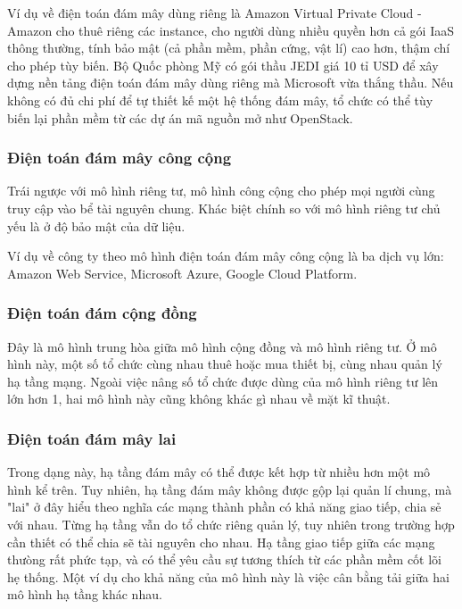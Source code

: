 \documentclass{article}
\begin{document}
Ví dụ về điện toán đám mây dùng riêng là Amazon Virtual Private Cloud - Amazon
cho thuê riêng các instance, cho người dùng nhiều quyền hơn cả gói IaaS thông
thường, tính bảo mật (cả phần mềm, phần cứng, vật lí) cao hơn, thậm chí cho phép
tùy biến. Bộ Quốc phòng Mỹ có gói thầu JEDI giá 10 tỉ USD để xây dựng nền tảng
điện toán đám mây dùng riêng mà Microsoft vừa thắng thầu. Nếu không có đủ chi
phí để tự thiết kế một hệ thống đám mây, tổ chức có thể tùy biến lại phần mềm từ
các dự án mã nguồn mở như OpenStack.

\subsubsection{Điện toán đám mây công cộng}

Trái ngược với mô hình riêng tư, mô hình công cộng cho phép mọi người cùng truy
cập vào bể tài nguyên chung. Khác biệt chính so với mô hình riêng tư chủ yếu là
ở độ bảo mật của dữ liệu.

Ví dụ về công ty theo mô hình điện toán đám mây công cộng là ba dịch vụ lớn:
Amazon Web Service, Microsoft Azure, Google Cloud Platform.

\subsubsection{Điện toán đám cộng đồng}

Đây là mô hình trung hòa giữa mô hình cộng đồng và mô hình riêng tư. Ở mô hình
này, một số tổ chức cùng nhau thuê hoặc mua thiết bị, cùng nhau quản lý hạ tầng
mạng. Ngoài việc nâng số tổ chức được dùng của mô hình riêng tư lên lớn hơn 1,
hai mô hình này cũng không khác gì nhau về mặt kĩ thuật.

\subsubsection{Điện toán đám mây lai}

Trong dạng này, hạ tầng đám mây có thể được kết hợp từ nhiều hơn một mô hình kể
trên. Tuy nhiên, hạ tầng đám mây không được gộp lại quản lí chung, mà "lai" ở
đây hiểu theo nghĩa các mạng thành phần có khả năng giao tiếp, chia sẻ với nhau.
Từng hạ tầng vẫn do tổ chức riêng quản lý, tuy nhiên trong trường hợp cần thiết
có thể chia sẽ tài nguyên cho nhau. Hạ tầng giao tiếp giữa các mạng thưòng rất
phức tạp, và có thể yêu cầu sự tương thích từ các phần mềm cốt lõi hẹ thống. Một
ví dụ cho khả năng của mô hình này là việc cân bằng tải giữa hai mô hình hạ tầng
khác nhau.
\end{document}
